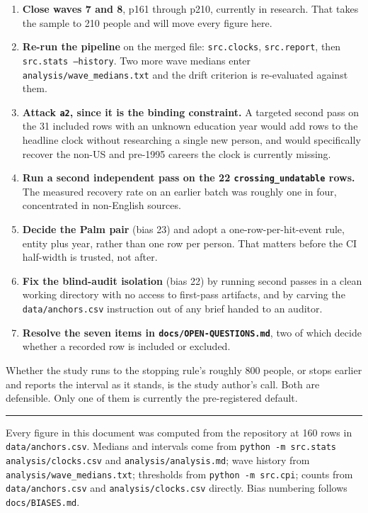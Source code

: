 \documentclass[11pt]{article}
\begin{document}
\begin{enumerate}
\item \textbf{Close waves 7 and 8}, p161 through p210, currently in research.
      That takes the sample to 210 people and will move every figure here.
\item \textbf{Re-run the pipeline} on the merged file: \texttt{src.clocks},
      \texttt{src.report}, then \texttt{src.stats --history}. Two more wave
      medians enter \texttt{analysis/wave\_medians.txt} and the drift criterion
      is re-evaluated against them.
\item \textbf{Attack \texttt{a2}, since it is the binding constraint.} A
      targeted second pass on the 31 included rows with an unknown education
      year would add rows to the headline clock without researching a single
      new person, and would specifically recover the non-US and pre-1995
      careers the clock is currently missing.
\item \textbf{Run a second independent pass on the 22
      \texttt{crossing\_undatable} rows.} The measured recovery rate on an
      earlier batch was roughly one in four, concentrated in non-English
      sources.
\item \textbf{Decide the Palm pair} (bias 23) and adopt a one-row-per-hit-event
      rule, entity plus year, rather than one row per person. That matters
      before the CI half-width is trusted, not after.
\item \textbf{Fix the blind-audit isolation} (bias 22) by running second passes
      in a clean working directory with no access to first-pass artifacts, and
      by carving the \texttt{data/anchors.csv} instruction out of any brief
      handed to an auditor.
\item \textbf{Resolve the seven items in \texttt{docs/OPEN-QUESTIONS.md}}, two
      of which decide whether a recorded row is included or excluded.
\end{enumerate}

Whether the study runs to the stopping rule's roughly 800 people, or stops
earlier and reports the interval as it stands, is the study author's call. Both
are defensible. Only one of them is currently the pre-registered default.

\vspace{1.5em}
\noindent\rule{\linewidth}{0.4pt}

\footnotesize
\noindent Every figure in this document was computed from the repository at 160
rows in \texttt{data/anchors.csv}. Medians and intervals come from
\texttt{python -m src.stats analysis/clocks.csv} and
\texttt{analysis/analysis.md}; wave history from
\texttt{analysis/wave\_medians.txt}; thresholds from \texttt{python -m src.cpi};
counts from \texttt{data/anchors.csv} and \texttt{analysis/clocks.csv}
directly. Bias numbering follows \texttt{docs/BIASES.md}.
\end{document}
